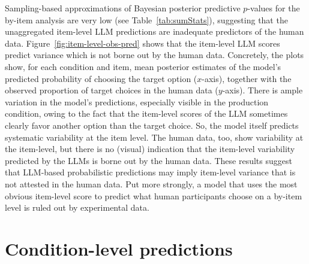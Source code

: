 \documentclass[fleqn]{article}
\begin{document}
Sampling-based approximations of Bayesian posterior predictive $p$-values for the by-item analysis are very low (see Table~\ref{tab:sumStats}), suggesting that the unaggregated item-level LLM predictions are inadequate predictors of the human data.
Figure~\ref{fig:item-level-obs-pred} shows that the item-level LLM scores predict variance which is not borne out by the human data.
Concretely, the plots show, for each condition and item, mean posterior estimates of the model's predicted probability of choosing the target option ($x$-axis), together with the observed proportion of target choices in the human data ($y$-axis).
There is ample variation in the model's predictions, especially visible in the production condition, owing to the fact that the item-level scores of the LLM sometimes clearly favor another option than the target choice.
So, the model itself predicts systematic variability at the item level.
The human data, too, show variability at the item-level, but there is no (visual) indication that the item-level variability predicted by the LLMs is borne out by the human data.
These results suggest that LLM-based probabilistic predictions may imply item-level variance that is not attested in the human data.
Put more strongly, a model that uses the most obvious item-level score to predict what human participants choose on a by-item level is ruled out by experimental data.



\section{Condition-level predictions}
\label{llm-predictions-for-reference-games}

\end{document}
